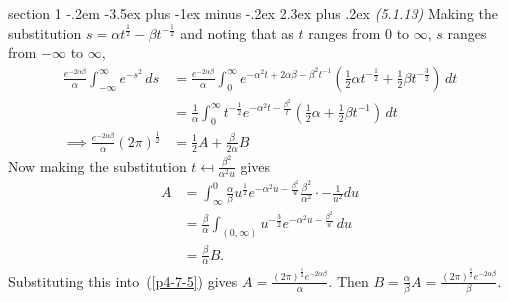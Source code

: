 \documentclass[12pt]{article}
\makeatletter
\theoremstyle{norm}
\newcommand{\rc}[1]{\frac{1}{#1}}
\newcommand{\al}[0]{\alpha}
\newcommand{\be}[0]{\beta}
\newcommand{\pa}[1]{\left( {#1} \right)}
\newcommand{\iy}[0]{\infty}
\newenvironment{problem}{\@startsection
       {section}
       {1}
       {-.2em}
       {-3.5ex plus -1ex minus -.2ex}
       {2.3ex plus .2ex}
       {\pagebreak[3]%
       \large\bf\noindent{Problem }
       }
       }
       {%
       }
\makeatother
\begin{document}
\begin{problem}{\it (5.1.13)}
Making the substitution $s=\al t^{\rc 2} -\be t^{-\rc2}$ and 
noting that as $t$ ranges from 0 to $\iy$, $s$ ranges from $-\iy$ to $\iy$,
\begin{align}
\nonumber
\frac{e^{-2\al\be}}{\al}\int_{-\iy}^{\iy} e^{-s^2}\,ds
&=\frac{e^{-2\al\be}}{\al}\int_{0}^{\iy}e^{-\al^2 t+2\al\be -\be^2t^{-1}}\pa{\rc2\al t^{-\rc 2}+\rc 2\be t^{-\frac 32}}\,dt\\
\nonumber
&=\rc{\al}\int_0^{\iy} t^{-\rc 2} e^{-\al^2 t-\frac{\be^2}{t}}\pa{\rc 2 \al+\rc 2\be t^{-1}
}\,dt\\
\label{p4-7-5}
\implies \frac{e^{-2\al\be}}{\al}(2\pi)^{\rc2}&=\rc{2}A+\frac{\be}{2\al}B
\end{align}
Now making the substitution $t\mapsfrom \frac{\be^2}{\al^2u}$ gives
\begin{align*}
A&=\int_{\iy}^0 \frac{\al}{\be}u^{\rc2} e^{-\al^2u-\frac{\be^2}u}\frac{\be^2}{\al^2}\cdot -\rc{u^2}du\\
&=\frac{\be}{\al}\int_{(0,\iy)} u^{-\frac 32}e^{-\al^2u-\frac{\be^2}u}\,du\\
&=\frac{\be}{\al}B.
\end{align*}
Substituting this into~(\ref{p4-7-5}) gives $A=\frac{(2\pi)^{\rc2}e^{-2\al\be}}{\al}$. Then $B=\frac{\al}{\be}A=\frac{(2\pi)^{\rc2}e^{-2\al\be}}{\be}$.

\end{problem}
\end{document}
